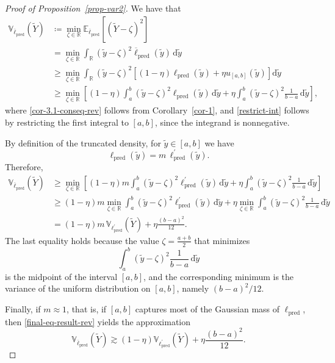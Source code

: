 \documentclass[12pt, english, oneside, a4paper]{article}
\begin{document}
\begin{proof}[Proof of Proposition~\ref{prop-var2}]
    We have that
    \begin{align}
        \mathbb{V}_{\overline{\ell}_\text{pred}}(\tilde{Y})
        &\coloneqq \min_{\zeta\in\mathbb{R}} \mathbb{E}_{\overline{\ell}_\text{pred}}[(\tilde{Y}-\zeta)^2] \nonumber \\
        &= \min_{\zeta\in\mathbb{R}} \int_\mathbb{R} (\tilde{y}-\zeta)^2 \overline{\ell}_\text{pred}(\tilde{y})\,\text{d}\tilde{y} \nonumber \\
        &\geq \min_{\zeta\in\mathbb{R}} \int_\mathbb{R} (\tilde{y}-\zeta)^2
        \left[(1-\eta) \ell_\text{pred}(\tilde{y}) + \eta u_{[a,b]}(\tilde{y}) \right]
        \text{d}\tilde{y} \label{cor-3.1-conseq-rev}\\
        &\geq \min_{\zeta\in\mathbb{R}} \left[
        (1-\eta)\int_a^b (\tilde{y}-\zeta)^2 \ell_\text{pred}(\tilde{y})\,\text{d}\tilde{y}
        +
        \eta \int_a^b (\tilde{y}-\zeta)^2 \frac{1}{b-a}\,\text{d}\tilde{y}
        \right], \label{restrict-int}
    \end{align}
    where \eqref{cor-3.1-conseq-rev} follows from Corollary~\ref{cor-1}, and \eqref{restrict-int} follows by restricting the first integral to $[a,b]$, since the integrand is nonnegative.

    By definition of the truncated density, for $\tilde y\in[a,b]$ we have
    \[
    \ell_\text{pred}(\tilde y)=m\,\ell_\text{pred}^\prime(\tilde y).
    \]
    Therefore,
    \begin{align}
        \mathbb{V}_{\overline{\ell}_\text{pred}}(\tilde{Y})
        &\geq \min_{\zeta\in\mathbb{R}} \left[
        (1-\eta)m\int_a^b (\tilde{y}-\zeta)^2 \ell_\text{pred}^\prime(\tilde{y})\,\text{d}\tilde{y}
        +
        \eta \int_a^b (\tilde{y}-\zeta)^2 \frac{1}{b-a}\,\text{d}\tilde{y}
        \right] \nonumber \\
        &\geq (1-\eta)m \min_{\zeta\in\mathbb{R}} \int_a^b (\tilde{y}-\zeta)^2 \ell_\text{pred}^\prime(\tilde{y})\,\text{d}\tilde{y}
        +
        \eta \min_{\zeta\in\mathbb{R}} \int_a^b (\tilde{y}-\zeta)^2 \frac{1}{b-a}\,\text{d}\tilde{y} \nonumber \\
        &= (1-\eta)m\, \mathbb{V}_{{\ell}_\text{pred}^\prime}(\tilde{Y}) + \eta \frac{(b-a)^2}{12}. \label{final-eq-result-rev}
    \end{align}
    The last equality holds because the value $\zeta=\frac{a+b}{2}$ that minimizes
    \[
    \int_a^b (\tilde{y}-\zeta)^2 \frac{1}{b-a}\,\text{d}\tilde{y}
    \]
    is the midpoint of the interval $[a,b]$, and the corresponding minimum is the variance of the uniform distribution on $[a,b]$, namely $(b-a)^2/12$.

    Finally, if $m\approx 1$, that is, if $[a,b]$ captures most of the Gaussian mass of $\ell_\text{pred}$, then \eqref{final-eq-result-rev} yields the approximation
    \[
    \mathbb{V}_{\overline{\ell}_\text{pred}}(\tilde{Y}) \gtrsim
    (1-\eta)\mathbb{V}_{{\ell}_\text{pred}^\prime}(\tilde{Y}) + \eta \frac{(b-a)^2}{12}.
    \]
\end{proof}
\end{document}
